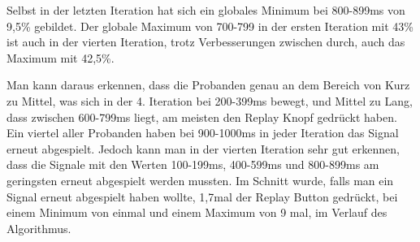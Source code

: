 Selbst in der letzten Iteration hat sich ein globales Minimum bei 800-899ms von 9,5\% gebildet. Der globale Maximum von 700-799 in der ersten Iteration mit 43\% ist auch in der vierten Iteration, trotz Verbesserungen zwischen durch, auch das Maximum mit 42,5\%. 

Man kann daraus erkennen, dass die Probanden genau an dem Bereich von Kurz zu Mittel, was sich in der 4. Iteration bei 200-399ms bewegt, und Mittel zu Lang, dass zwischen 600-799ms liegt, am meisten den Replay Knopf gedr{\"u}ckt haben. Ein viertel aller Probanden haben bei 900-1000ms in jeder Iteration das Signal erneut abgespielt. Jedoch kann man in der vierten Iteration sehr gut erkennen, dass die Signale mit den  Werten 100-199ms, 400-599ms und 800-899ms am geringsten erneut abgespielt werden mussten.
Im Schnitt wurde, falls man ein Signal erneut abgespielt haben wollte, 1,7mal der Replay Button gedr{\"u}ckt, bei einem Minimum von einmal und einem Maximum von 9 mal, im Verlauf des Algorithmus. 




